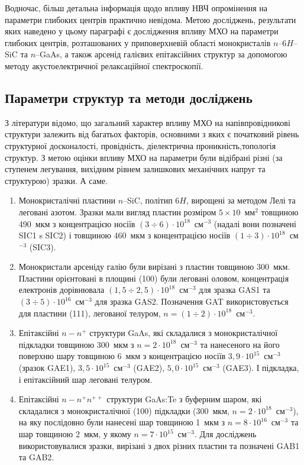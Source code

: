 \documentclass[a4paper,14pt,oneside,openany]{memoir}
\begin{document}
Водночас, більш детальна інформація щодо впливу НВЧ опромінення на параметри глибоких центрів практично невідома.
Метою досліджень, результати яких наведено у цьому параграфі є дослідження впливу МХО на параметри глибоких центрів, розташованих у приповерхневій області монокристалів $n$--6$H$--SiC та $n$--GaAs, а також арсенід галієвих епітаксійних структур за допомогою методу акустоелектричної релаксаційної спектроскопії.



\subsection{Параметри структур та методи досліджень}

З літератури \cite{Boltovets,Kr1996,Milenin1994,BelyaevIntac,ASHKINADZE1996,ProcSPIE,Venger1999} відомо,
що загальний характер впливу МХО на напівпровідникові структури залежить від багатьох факторів, основними з яких
є початковий рівень структурної досконалості, провідність, діелектрична проникність,топологія структур.
З метою оцінки впливу МХО на параметри були відібрані різні (за ступенем легування, вихідним рівнем залишкових механічних напруг та структурою) зразки.
А саме.
\begin{enumerate}[label=\asbuk*),leftmargin=0em,itemindent=1.5em]
\item Монокристалічні пластини $n$--SiC, політип 6$H$, вирощені  за методом Лелі та леговані азотом.
Зразки мали вигляд пластин розміром $5\times10$~мм$^2$ товщиною 490~мкм з концентрацією носіїв $(3\div6)\cdot10^{18}$~см$^{-3}$ (надалі вони позначені SIC1 s SIC2)
і товщиною 460~мкм з концентрацією носіїв $(1\div3)\cdot10^{18}$~см$^{-3}$ (SIC3).

\item Монокристали арсеніду галію були вирізані з пластин товщиною 300~мкм.
Пластини орієнтовані в площині (100) були леговані оловом, концентрація електронів дорівнювала $(1,5\div2,5)\cdot10^{18}$~см$^{-3}$ для зразка GAS1
та $(3\div5)\cdot10^{16}$~см$^{-3}$ для зразка GAS2.
Позначення GAT використовується для пластини (111), легованої телуром, $n=(1\div2)\cdot10^{18}$~см$^{-3}$.

\item Епітаксійні $n-n^+$ структури GaAs, які складалися з монокристалічної підкладки товщиною 300~мкм з $n=2\cdot10^{18}$~см$^{-3}$
та нанесеного на його поверхню  шару товщиною 6~мкм з концентрацією носіїв $3,9\cdot10^{15}$~см$^{-3}$ (зразок GAE1),
$3,5\cdot10^{15}$~см$^{-3}$ (GAE2), $5,0\cdot10^{15}$~см$^{-3}$ (GAE3).
І підкладка, і епітаксійний шар леговані телуром.

\item Епітаксійні $n-n^+n^{++}$ структури GaAs:Te з буферним шаром, які складалися з монокристалічної (100) підкладки (300~мкм, $n=2\cdot10^{18}$~см$^{-3}$),
на яку послідовно були нанесені шар товщиною 1~мкм з $n=8\cdot10^{16}$~см$^{-3}$
та шар товщиною 2~мкм, у якому $n=7\cdot10^{15}$~см$^{-3}$.
Для досліджень використовувалися зразки, вирізані з двох різних пластин та позначені GAB1 та GAB2.
\end{enumerate}
\end{document}
